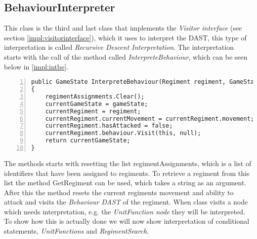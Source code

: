 \subsection{BehaviourInterpreter}
	This class is the third and last class that implements the \textit{Visitor interface} (see section \ref{impl:visitorinterface}), which it uses to interpret the 
	DAST, this type of interpretation is called {\it Recursive Descent Interpretation}. The interpretation starts with the call of the
	method called {\it InterpreteBehaviour}, which can be seen below in \ref{impl:intbe}.
	\begin{lstlisting}[basicstyle=\small\sffamily,
		keywords={break,case,const,continue,default,else,enum,
		for,if,return,switch,while,do,long,void,int,float,double,
		char,struct,typedef,include,size\_t},
		keywordstyle={\color{blue}},
		comment={[l]{//}}, morecomment={[s]{/*}{*/}}, commentstyle=\itshape,
		columns={[l]flexible}, numbers=left, numberstyle=\tiny,
		frameround=fftt, frame=shadowbox, captionpos=b,
		caption={The method InterpreteBehaviour},
		label=impl:intbe]
public GameState InterpreteBehaviour(Regiment regiment, GameState gameState)
{
	regimentAssignments.Clear();
	currentGameState = gameState;
	currentRegiment = regiment;
	currentRegiment.currentMovement = currentRegiment.movement;
	currentRegiment.hasAttacked = false;
	currentRegiment.behaviour.Visit(this, null);
	return currentGameState;
}		
	\end{lstlisting}
	The methods starts with resetting the list regimentAssignments, which is a list of identifiers that have been assigned to regiments. To retrieve 
	a regiment from this list the method GetRegiment can be used, which takes a string as an argument.
	After this the method resets the current regiments movement and ability to attack and visits the {\it Behaviour DAST} of the regiment. 
	When class visits a node which needs interpretation, e.g. the {\it UnitFunction node} they will be interpreted. To show 
	how this is actually done we will now show interpretation of conditional statements, {\it UnitFunctions} and {\it RegimentSearch}.
	
